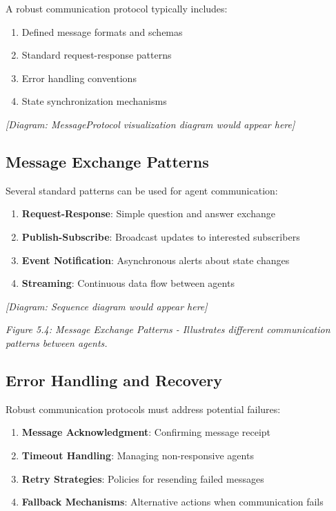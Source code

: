 \documentclass[11pt,oneside]{book}
\providecommand{\tightlist}{%
  \setlength{\itemsep}{0pt}\setlength{\parskip}{0pt}}
\begin{document}
A robust communication protocol typically includes:

\begin{enumerate}
\def\labelenumi{\arabic{enumi}.}
\tightlist
\item
  Defined message formats and schemas
\item
  Standard request-response patterns
\item
  Error handling conventions
\item
  State synchronization mechanisms
\end{enumerate}

\emph{{[}Diagram: MessageProtocol visualization diagram would appear
here{]}}

\subsection{Message Exchange Patterns}\label{message-exchange-patterns}

Several standard patterns can be used for agent communication:

\begin{enumerate}
\def\labelenumi{\arabic{enumi}.}
\tightlist
\item
  \textbf{Request-Response}: Simple question and answer exchange
\item
  \textbf{Publish-Subscribe}: Broadcast updates to interested
  subscribers
\item
  \textbf{Event Notification}: Asynchronous alerts about state changes
\item
  \textbf{Streaming}: Continuous data flow between agents
\end{enumerate}

\emph{{[}Diagram: Sequence diagram would appear here{]}}

\emph{Figure 5.4: Message Exchange Patterns - Illustrates different
communication patterns between agents.}

\subsection{Error Handling and
Recovery}\label{error-handling-and-recovery}

Robust communication protocols must address potential failures:

\begin{enumerate}
\def\labelenumi{\arabic{enumi}.}
\tightlist
\item
  \textbf{Message Acknowledgment}: Confirming message receipt
\item
  \textbf{Timeout Handling}: Managing non-responsive agents
\item
  \textbf{Retry Strategies}: Policies for resending failed messages
\item
  \textbf{Fallback Mechanisms}: Alternative actions when communication
  fails
\end{enumerate}
\end{document}
